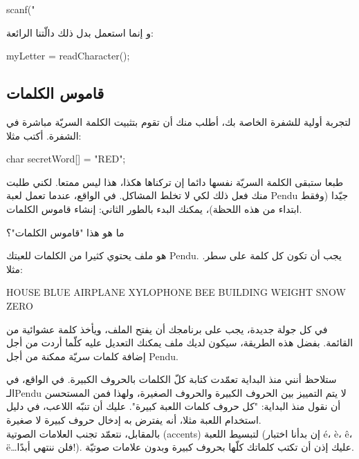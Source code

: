 \begin{Csource}
scanf("%
\end{Csource}

و إنما استعمل بدل ذلك دالّتنا الرائعة:

\begin{Csource}
myLetter = readCharacter();
\end{Csource}

\subsection{قاموس الكلمات}
لتجربة أولية للشفرة الخاصة بك، أطلب منك أن تقوم بتثبيت الكلمة السريّة مباشرة في الشفرة. أكتب مثلا:

\begin{Csource}
char secretWord[] = "RED";
\end{Csource}

طبعا ستبقى الكلمة السريّة نفسها دائما إن تركناها هكذا، هذا ليس ممتعا. لكني طلبت منك فعل ذلك لكي لا تخلط المشاكل. في الواقع، عندما تعمل لعبة
\textenglish{Pendu}
جيّدا (وفقط ابتداء من هذه اللحظة)، يمكنك البدء بالطور الثاني: إنشاء قاموس الكلمات.

\begin{question}
ما هو هذا "قاموس الكلمات"؟
\end{question}

هو ملف يحتوي كثيرا من الكلمات للعبتك
\textenglish{Pendu}.
يجب أن تكون كل كلمة على سطر. مثلا:

\begin{Console}
HOUSE
BLUE
AIRPLANE
XYLOPHONE
BEE
BUILDING
WEIGHT
SNOW
ZERO
\end{Console}

في كل جولة جديدة، يجب على برنامجك أن يفتح الملف، ويأخذ كلمة عشوائية من القائمة. بفضل هذه الطريقة، سيكون لديك ملف يمكنك التعديل عليه كلّما أردت من أجل إضافة كلمات سريّة ممكنة من أجل
\textenglish{Pendu}.

\begin{information}
ستلاحظ أنني منذ البداية تعمّدت كتابة كلّ الكلمات بالحروف الكبيرة. في الواقع، في الـ\textenglish{Pendu}
لا يتم التمييز بين الحروف الكبيرة والحروف الصغيرة، ولهذا فمن المستحسن أن نقول منذ البداية: "كل حروف كلمات اللعبة كبيرة". عليك أن تنبّه اللاعب، في دليل استخدام اللعبة مثلا، أنه يفترض به إدخال حروف كبيرة لا صغيرة.\\
بالمقابل، نتعمّد تجنب العلامات الصوتية
(\textenglish{accents})
لتبسيط اللعبة (إن بدأنا اختبار \textenglish{é}، \textenglish{è}، \textenglish{ê}، \textenglish{ë}\dots فلن ننتهي أبدًا!). عليك إذن أن تكتب كلماتك كلّها بحروف كبيرة وبدون علامات صوتيّة.
\end{information}

